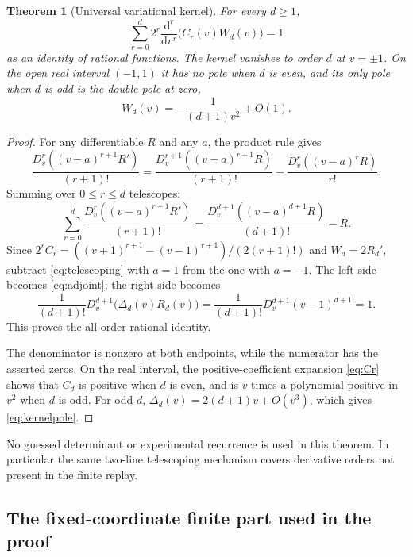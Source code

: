 \documentclass[11pt,letterpaper]{article}
\numberwithin{equation}{section}
\theoremstyle{plain}
\newtheorem{theorem}{Theorem}[section]
\theoremstyle{definition}
\theoremstyle{remark}
\begin{document}
\begin{theorem}[Universal variational kernel]\label{thm:kernel}
For every $d\ge1$,
\begin{equation}\label{eq:adjoint}
 \sum_{r=0}^d2^r\frac{\mathrm d^r}{\mathrm dv^r}
      \bigl(C_r(v)W_d(v)\bigr)=1
\end{equation}
as an identity of rational functions. The kernel vanishes to order $d$ at $v=\pm1$. On the open real interval $(-1,1)$ it has no pole when $d$ is even, and its only pole when $d$ is odd is the double pole at zero,
\begin{equation}\label{eq:kernelpole}
 W_d(v)=-\frac1{(d+1)v^2}+O(1).
\end{equation}
\end{theorem}

\begin{proof}
For any differentiable $R$ and any $a$, the product rule gives
\[
 \frac{D_v^r((v-a)^{r+1}R')}{(r+1)!}
 =\frac{D_v^{r+1}((v-a)^{r+1}R)}{(r+1)!}
  -\frac{D_v^r((v-a)^rR)}{r!}.
\]
Summing over $0\le r\le d$ telescopes:
\begin{equation}\label{eq:telescoping}
 \sum_{r=0}^d\frac{D_v^r((v-a)^{r+1}R')}{(r+1)!}
 =\frac{D_v^{d+1}((v-a)^{d+1}R)}{(d+1)!}-R.
\end{equation}
Since $2^rC_r=((v+1)^{r+1}-(v-1)^{r+1})/(2(r+1)!)$ and $W_d=2R_d'$, subtract \eqref{eq:telescoping} with $a=1$ from the one with $a=-1$. The left side becomes \eqref{eq:adjoint}; the right side becomes
\[
 \frac1{(d+1)!}D_v^{d+1}\bigl(\Delta_d(v)R_d(v)\bigr)
 =\frac1{(d+1)!}D_v^{d+1}(v-1)^{d+1}=1.
\]
This proves the all-order rational identity.

The denominator is nonzero at both endpoints, while the numerator has the asserted zeros. On the real interval, the positive-coefficient expansion \eqref{eq:Cr} shows that $C_d$ is positive when $d$ is even, and is $v$ times a polynomial positive in $v^2$ when $d$ is odd. For odd $d$, $\Delta_d(v)=2(d+1)v+O(v^3)$, which gives \eqref{eq:kernelpole}.
\end{proof}

No guessed determinant or experimental recurrence is used in this theorem. In particular the same two-line telescoping mechanism covers derivative orders not present in the finite replay.

\subsection{The fixed-coordinate finite part used in the proof}
\end{document}
